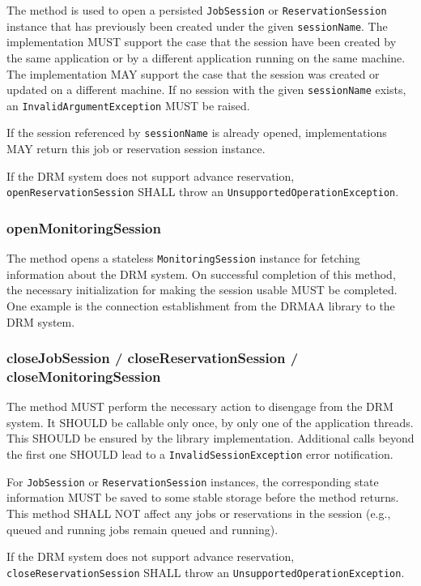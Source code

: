 \documentclass{article}
\newcommand{\h}[1]{\lstinline|#1|}
\begin{document}
The method is used to open a persisted \h{JobSession} or \h{ReservationSession} instance that has previously been created under the given \h{sessionName}. The implementation MUST support the case that the session have been created by the same application or by a different application running on the same machine. The implementation MAY support the case that the session was created or updated on a different machine. If no session with the given \h{sessionName} exists, an \h{InvalidArgumentException} MUST be raised.

If the session referenced by \h{sessionName} is already opened, implementations MAY return this job or reservation session instance.

If the DRM system does not support advance reservation, \h{openReservationSession} SHALL throw an \h{UnsupportedOperationException}.

\subsubsection{openMonitoringSession}

The method opens a stateless \h{MonitoringSession} instance for fetching information about the DRM system. On successful completion of this method, the necessary initialization for making the session usable MUST be completed. One example is the connection establishment from the DRMAA library to the DRM system.

\subsubsection{closeJobSession / closeReservationSession / closeMonitoringSession}
\label{sec:closesession}

The method MUST perform the necessary action to disengage from the DRM system. It SHOULD be callable only once, by only one of the application threads. This SHOULD be ensured by the library implementation. Additional calls beyond the first one SHOULD lead to a \h{InvalidSessionException} error notification.

For \h{JobSession} or \h{ReservationSession} instances, the corresponding state information MUST be saved to some stable storage before the method returns. This method SHALL NOT affect any jobs or reservations in the session (e.g., queued and running jobs remain queued and running).

If the DRM system does not support advance reservation, \h{closeReservationSession} SHALL throw an \h{UnsupportedOperationException}.
\end{document}
